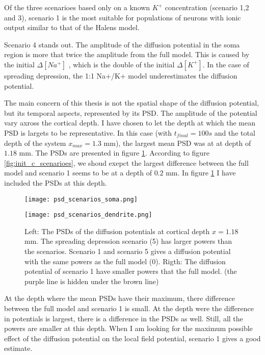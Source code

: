 \documentclass{article}
\begin{document}
Of the three scenarioes based only on a known $K^+$ concentration (scenario 1,2 and 3), scenario 1 is the most suitable for populations of neurons with ionic output similar to that of the Halens model.

Scenario 4 stands out. The amplitude of the diffusion potential in the soma region is more that twice the amplitude from the full model. This is caused by the initial $\Delta [Na^+]$ , which is the double of the initial $\Delta[K^+]$. In the case of spreading depression, the 1:1 Na+/K+ model underestimates the diffusion potential. 

The main concern of this thesis is not the spatial shape of the diffusion potential, but its temporal aspects, represented by its PSD. The amplitude of the potential vary axross the cortical depth. I have chosen to let the depth at which the mean PSD is largets to be representative. In this case (with $t_{final}=100s$ and the total depth of the system $x_{max} = 1.3$ mm), the largest mean PSD was at at depth of $1.18$ mm. The PSDs are presented in figure \ref{fig:psd_scenarios}.  According to figure \ref{fig:init_c_scenarioes}, we shoud exepct the largest difference between the full model and scenario 1 seems to be at a depth of $0.2$ mm. In figure \ref{fig:psd_scenarios} I have included the PSDs at this depth. 

\begin{figure}[!tbp]
  \centering
  \begin{minipage}[b]{0.45\textwidth}
    \texttt{[image: psd\_scenarios\_soma.png]}

  \end{minipage}
\hfill
  \begin{minipage}[b]{0.45\textwidth}
    \texttt{[image: psd\_scenarios\_dendrite.png]}

  \end{minipage}
  \label{fig:psd_scenarios}
  \caption{Left: The PSDs of the diffusion potentials at cortical depth $x=1.18$ mm. The spreading depression scenario (5) has larger powers than the scenarios. Scenario 1 and scenario 5 gives a diffusion potential with the same powers as the full model (0). 
  Rigth: The diffusion potential of scenario 1 have smaller powers that the full model. (the purple line is hidden under the brown line) }

\end{figure} 

At the depth where the mean PSDs have their maximum, there difference between the full model and scenario 1 is small. At the depth were the difference in potentials is largest, there is a difference in the PSDs as well. Still, all the powers are smaller at this depth. When I am looking for the maximum possible effect of the diffusion potential on the local field potential, scenario 1 gives a good estimate. 
\end{document}

